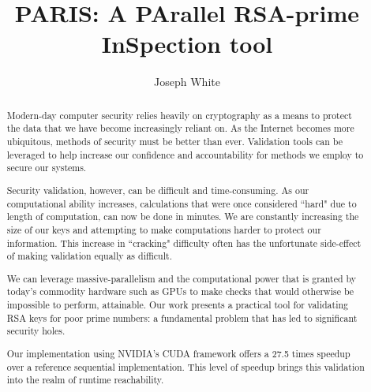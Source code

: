 \documentclass[12pt]{ucthesis}
\begin{document}
\title{PARIS: A PArallel RSA-prime InSpection tool}
\author{Joseph White}
  
 
   
 
\maketitle

\begin{frontmatter}
\copyrightpage
\committeemembershippage


\begin{abstract}

Modern-day computer security relies heavily on cryptography as a means to
protect the data that we have become increasingly reliant on. As the Internet
becomes more ubiquitous, methods of security must be better than ever.
Validation tools can be leveraged to help increase our confidence and
accountability for methods we employ to secure our systems. 

Security validation, however, can be difficult and time-consuming. As our
computational ability increases, calculations that were once considered ``hard"
due to length of computation, can now be done in minutes. We are constantly
increasing the size of our keys and attempting to make computations harder to
protect our information. This increase in ``cracking" difficulty often has the
unfortunate side-effect of making validation equally as difficult.

We can leverage massive-parallelism and the computational power that is granted
by today's commodity hardware such as GPUs to make checks that would
otherwise be impossible to perform, attainable. Our work presents a practical tool for
validating RSA keys for poor prime numbers: a fundamental problem that has led
to significant security holes.

Our implementation using NVIDIA's CUDA framework offers a 27.5 times speedup
over a reference sequential implementation. This level of speedup brings this
validation into the realm of runtime reachability.


\end{abstract}


\tableofcontents


\listoftables
\listoffigures
\end{frontmatter}
\end{document}
